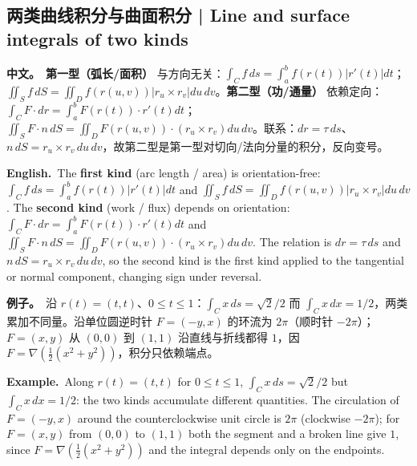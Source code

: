\documentclass[UTF8,11pt,a4paper]{ctexart}
\newcommand{\BOTH}[2]{\par\noindent\textbf{中文。}\ #1\par\noindent\textbf{English.}\ #2\par}
\newcommand{\EX}[2]{\par\noindent\textbf{例子。}\ #1\par\noindent\textbf{Example.}\ #2\par}
\begin{document}
\subsection{两类曲线积分与曲面积分 | Line and surface integrals of two kinds}
\BOTH{\textbf{第一型（弧长/面积）} 与方向无关：$\int_Cf\,ds=\int_a^bf(r(t))|r'(t)|dt$；$\iint_Sf\,dS=\iint_Df(r(u,v))|r_u\times r_v|du\,dv$。\textbf{第二型（功/通量）} 依赖定向：$\int_CF\cdot dr=\int_a^bF(r(t))\cdot r'(t)dt$；$\iint_SF\cdot n\,dS=\iint_DF(r(u,v))\cdot(r_u\times r_v)du\,dv$。联系：$dr=\tau\,ds$、$n\,dS=r_u\times r_v\,du\,dv$，故第二型是第一型对切向/法向分量的积分，反向变号。}{The \textbf{first kind} (arc length / area) is orientation-free: $\int_Cf\,ds=\int_a^bf(r(t))|r'(t)|dt$ and $\iint_Sf\,dS=\iint_Df(r(u,v))|r_u\times r_v|du\,dv$. The \textbf{second kind} (work / flux) depends on orientation: $\int_CF\cdot dr=\int_a^bF(r(t))\cdot r'(t)dt$ and $\iint_SF\cdot n\,dS=\iint_DF(r(u,v))\cdot(r_u\times r_v)du\,dv$. The relation is $dr=\tau\,ds$ and $n\,dS=r_u\times r_v\,du\,dv$, so the second kind is the first kind applied to the tangential or normal component, changing sign under reversal.}
\EX{沿 $r(t)=(t,t)$、$0\le t\le1$：$\int_Cx\,ds=\sqrt2/2$ 而 $\int_Cx\,dx=1/2$，两类累加不同量。沿单位圆逆时针 $F=(-y,x)$ 的环流为 $2\pi$（顺时针 $-2\pi$）；$F=(x,y)$ 从 $(0,0)$ 到 $(1,1)$ 沿直线与折线都得 $1$，因 $F=\nabla(\tfrac12(x^2+y^2))$，积分只依赖端点。}{Along $r(t)=(t,t)$ for $0\le t\le1$, $\int_Cx\,ds=\sqrt2/2$ but $\int_Cx\,dx=1/2$: the two kinds accumulate different quantities. The circulation of $F=(-y,x)$ around the counterclockwise unit circle is $2\pi$ (clockwise $-2\pi$); for $F=(x,y)$ from $(0,0)$ to $(1,1)$ both the segment and a broken line give $1$, since $F=\nabla(\tfrac12(x^2+y^2))$ and the integral depends only on the endpoints.}
\end{document}
